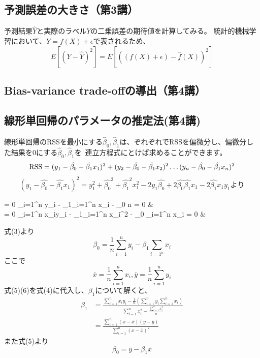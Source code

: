 \documentclass[uplatex]{jsarticle}
\begin{document}
\subsection{予測誤差の大きさ（第3講）}
予測結果$\hat{Y}$と実際のラベル$Y$の二乗誤差の期待値を計算してみる。
統計的機械学習において、$Y = f(X) + \epsilon$で表されるため、
$$E[(Y - \hat{Y})^2] = E[((f(X) + \epsilon) - \hat{f}(X))^2]$$

\subsection{Bias-variance trade-offの導出（第4講）}



\subsection{線形単回帰のパラメータの推定法(第4講)}
線形単回帰の{\rm RSS}を最小にする$\hat{\beta}_0, \hat{\beta}_1$は、ぞれぞれで{\rm RSS}を偏微分し、偏微分した結果を0にする$\hat{\beta}_0, \hat{\beta}_1$を\
連立方程式にとけば求めることができます。
$${\rm {\rm RSS}} = (y_1 - \hat{\beta_0} - \hat{\beta_1}x_1)^2 +  (y_2 - \hat{\beta_0} - \hat{\beta_1}x_2)^2 \ldots  (y_n - \hat{\beta_0} - \hat{\beta_1}x_n)^2$$
$$(y_1 - \hat{\beta_0} - \hat{\beta_1}x_1)^2 = y_1^2 + \hat{\beta_0}^2 + \hat{\beta_1}^2x_1^2 - 2y_1\hat{\beta_0} + 2\hat{\beta_0}\hat{\beta_1}x_1 -2\hat{\beta_1}x_1y_1より$$
\begin{numcases}
  {}
   = 0 \iff \sum_{i=1}^n y_i - \beta_1\sum_{i=1}^n x_i - \beta_0 n = 0  & \\
  \frac{\partial {\rm RSS}}{\partial \hat{\beta_1}} = 0 \iff \sum_{i=1}^n x_iy_i - \beta_1\sum_{i=1}^n x_i^2 - \beta_0 \sum_{i=1}^n x_i = 0  &
\end{numcases}
式(3)より
\begin{equation}
  \beta_0 = \frac{1}{n}\sum_{i=1}^n y_i - \beta_1\sum_{i=1^n}x_i
\end{equation}
ここで
\begin{equation}
  \overline{x} = \frac{1}{n}\sum_{i=1}^n x_i, \overline{y} = \frac{1}{n}\sum_{i=1}^n y_i
\end{equation}
式(5)(6)を式(4)に代入し、$\beta_1$について解くと、
\begin{equation*}
  \begin{split}
    \beta_1 &=  \frac{\sum_{i=1}^n x_iy_i - \frac{1}{n}(\sum_{i=1}^n y_i\sum_{i=1}^n x_i)}{\sum_{i=1}^n x_i^2 - \frac{\sum_{i=1}^n x_i^2}{n}} \\
    &= \frac{\sum_{i=1}^n(x - \overline{x})(y - \overline{y})}{\sum_{i=1}^n (x - \overline{x})^2}
  \end{split}
\end{equation*}
また式(5)より
$$\beta_0 = \overline{y} - \beta_1\overline{x}$$
\end{document}
